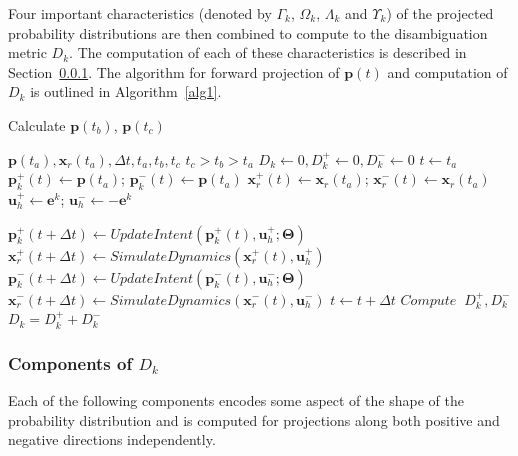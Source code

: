 Four important characteristics (denoted by $\Gamma_k$, $\Omega_k$, $\Lambda_k$ and $\Upsilon_k$) of the projected probability distributions are then combined to compute to the disambiguation metric $D_k$. The computation of each of these characteristics is described in Section~\ref{sssec:components}. The algorithm for forward projection of $\boldsymbol{p}(t)$ and computation of $D_k$ is outlined in Algorithm~\ref{alg1}.
\begin{algorithm}
	\caption{Calculate $\boldsymbol{p}(t_b)$, $\boldsymbol{p}(t_c)$}
	\label{alg1}
	\begin{algorithmic}
		\REQUIRE $\boldsymbol{p}(t_a), \boldsymbol{x}_r(t_a), \Delta t, t_a, t_b, t_c$
		\ENSURE $t_c > t_b > t_a$
		\STATE $D_k \leftarrow 0,D_k^+ \leftarrow 0, D_k^- \leftarrow 0 $
		\STATE $t \leftarrow t_a$
		\STATE $\boldsymbol{p}_k^+(t) \leftarrow \boldsymbol{p}(t_a)$; $\boldsymbol{p}_k^-(t) \leftarrow \boldsymbol{p}(t_a)$
		\STATE $\boldsymbol{x}_r^+(t) \leftarrow \boldsymbol{x}_r(t_a)$; $\boldsymbol{x}_r^-(t) \leftarrow \boldsymbol{x}_r(t_a)$
		\STATE $\boldsymbol{u}_h^+ \leftarrow \boldsymbol{e}^k$; $\boldsymbol{u}_h^- \leftarrow -\boldsymbol{e}^k$
		
		\STATE $\boldsymbol{p}^+_k(t + \Delta t) \leftarrow UpdateIntent(\boldsymbol{p}^+_k(t), \boldsymbol{u}_h^+; \boldsymbol{\Theta})$
		\STATE $\boldsymbol{x}_r^+(t + \Delta t) \leftarrow SimulateDynamics(\boldsymbol{x}_r^+(t), \boldsymbol{u}_h^+)$
		\STATE $\boldsymbol{p}^-_k(t + \Delta t) \leftarrow UpdateIntent(\boldsymbol{p}^-_k(t), \boldsymbol{u}_h^-; \boldsymbol{\Theta})$
		\STATE $\boldsymbol{x}_r^-(t + \Delta t) \leftarrow SimulateDynamics(\boldsymbol{x}_r^-(t), \boldsymbol{u}_h^-)$
		\STATE $t \leftarrow t + \Delta t$
		    \ENDIF
		\ENDWHILE
		\STATE $Compute \;\;D_k^+, D_k^-$
		\STATE $D_k = D_k^+ + D_k^-$
		\ENDFOR
		
	\end{algorithmic}
\end{algorithm}

\subsubsection{Components of $D_k$}\label{sssec:components}
Each of the following components encodes some aspect of the shape of the probability distribution and is computed for projections along both positive and negative directions independently. 

